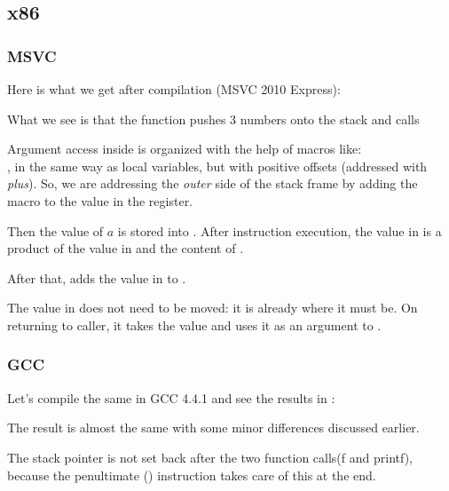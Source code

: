 \subsection{x86}

\subsubsection{MSVC}

Here is what we get after compilation (MSVC 2010 Express):




What we see is that the \main function pushes 3 numbers onto the stack and calls  

Argument access inside \ttf is organized with the help of macros like:\\
, 
in the same way as local variables, but with positive offsets (addressed with \emph{plus}).
So, we are addressing the \emph{outer} side of the \gls{stack frame} by adding the  macro to the value in the \EBP register.


Then the value of $a$ is stored into \EAX. After \IMUL instruction execution, the value in \EAX is 
a \gls{product} of the value in \EAX and the content of .

After that, \ADD adds the value in  to \EAX.

The value in \EAX does not need to be moved: it is already where it must be.
On returning to \gls{caller}, it takes the \EAX value and uses it as an argument to \printf.



\subsubsection{GCC}

Let's compile the same in GCC 4.4.1 and see the results in \IDA:



The result is almost the same with some minor differences discussed earlier.

The \gls{stack pointer} is not set back after the two function calls(f and printf), 
because the penultimate  () 
instruction takes care of this at the end.
